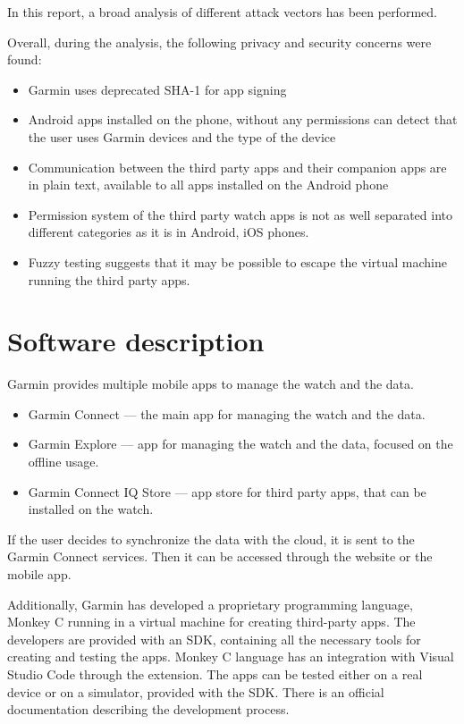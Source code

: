In this report, a broad analysis of different attack vectors has been performed.

Overall, during the analysis, the following privacy and security concerns were found:
\begin{itemize}
    \item Garmin uses deprecated SHA-1 for app signing
    \item Android apps installed on the phone, without any permissions can detect that the user uses Garmin devices and the type of the device
    \item Communication between the third party apps and their companion apps are in plain text, available to all apps installed on the Android phone
    \item Permission system of the third party watch apps is not as well separated into different categories as it is in Android, iOS phones.
    \item Fuzzy testing suggests that it may be possible to escape the virtual machine running the third party apps.
\end{itemize}


\section{Software description}
Garmin provides multiple mobile apps to manage the watch and the data.
\begin{itemize}
    \item Garmin Connect — the main app for managing the watch and the data.
    \item Garmin Explore — app for managing the watch and the data, focused on the offline usage.
    \item Garmin Connect IQ Store — app store for third party apps, that can be installed on the watch.
\end{itemize}

If the user decides to synchronize the data with the cloud, it is sent to the Garmin Connect services.
Then it can be accessed through the website or the mobile app.

Additionally, Garmin has developed a proprietary programming language, Monkey C running in a virtual machine for creating third-party apps.
The developers are provided with an SDK, containing all the necessary tools for creating and testing the apps.
Monkey C language has an integration with Visual Studio Code through the extension.
The apps can be tested either on a real device or on a simulator, provided with the SDK\@.
There is an official documentation describing the development process.

